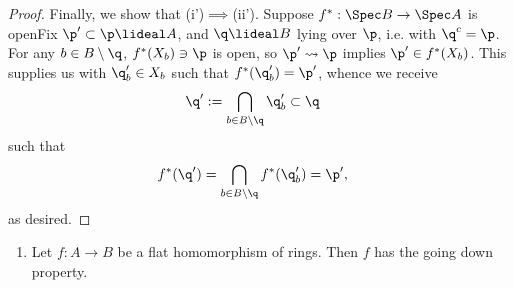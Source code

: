 \documentclass[12pt]{amsart}
\begin{document}
\begin{proof}

  Finally, we show that (i')$\implies$(ii').
  Suppose $f^*:\Spec B\to \Spec A$ is openFix $\p'\subset\p\lideal A$, and $\q\lideal B$ lying over $\p$, i.e. with $\q^c=\p$.
  For any $b\in B\setminus \q$, $f^*(X_b)\ni \p$ is open, so $\p'\rightsquigarrow\p$ implies $\p'\in f^*(X_b)$.
  This supplies us with $\q_b'\in X_b$ such that $f^*(\q_b')=\p'$, whence we receive
  \begin{align*}
    \q'&:=\bigcap_{b\in B\setminus\q}\q_b'\subset\q
  \end{align*}
  such that
  \begin{align*}
    f^*(\q') &= \bigcap_{b\in B\setminus \q}f^*(\q_b') = \p',
  \end{align*}
  as desired.
\end{proof}

\begin{enumerate}
  \item[5.11] {
      Let $f:A\to B$ be a flat homomorphism of rings.
      Then $f$ has the going down property.
    }
\end{enumerate}
\end{document}
